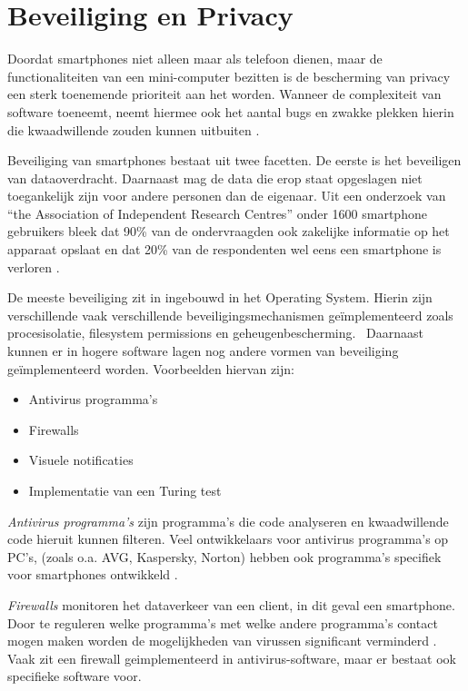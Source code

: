 \chapter{Beveiliging en Privacy}

Doordat smartphones niet alleen maar als telefoon dienen, maar de functionaliteiten van een mini-computer bezitten is de bescherming van privacy een sterk toenemende prioriteit aan het worden. Wanneer de complexiteit van software toeneemt, neemt hiermee ook het aantal bugs en zwakke plekken hierin die kwaadwillende zouden kunnen uitbuiten \citep{portokalidis2010paranoid}. 

Beveiliging van smartphones bestaat uit twee facetten. De eerste is het beveiligen van dataoverdracht. Daarnaast mag de data die erop staat opgeslagen niet toegankelijk zijn voor andere personen dan de eigenaar. Uit een onderzoek van ``the Association of Independent Research Centres'' onder 1600 smartphone gebruikers bleek dat 90\% van de ondervraagden ook zakelijke informatie op het apparaat opslaat en dat 20\% van de respondenten wel eens een smartphone is verloren \citep{charles2011}.  

De meeste beveiliging zit in ingebouwd in het Operating System. Hierin zijn verschillende vaak verschillende beveiligingsmechanismen ge\"implementeerd zoals procesisolatie, filesystem permissions en geheugenbescherming.  Daarnaast kunnen er in hogere software lagen nog andere vormen van beveiliging ge\"implementeerd worden. Voorbeelden hiervan zijn: 

\begin{itemize}
   \item Antivirus programma’s
   \item Firewalls
   \item Visuele notificaties
   \item Implementatie van een Turing test
\end{itemize}

\emph{Antivirus programma's} zijn programma’s die code analyseren en kwaadwillende code hieruit kunnen filteren. Veel ontwikkelaars voor antivirus programma's op PC's, (zoals o.a. AVG, Kaspersky, Norton) hebben ook programma's specifiek voor smartphones ontwikkeld \citep{becher2009security}. 

\emph{Firewalls} monitoren het dataverkeer van een client, in dit geval een smartphone. Door te reguleren welke programma's met welke andere programma's contact mogen maken worden de mogelijkheden van virussen significant verminderd \citep{becher2009security}. Vaak zit een firewall geimplementeerd in antivirus-software, maar er bestaat ook specifieke software voor. 

